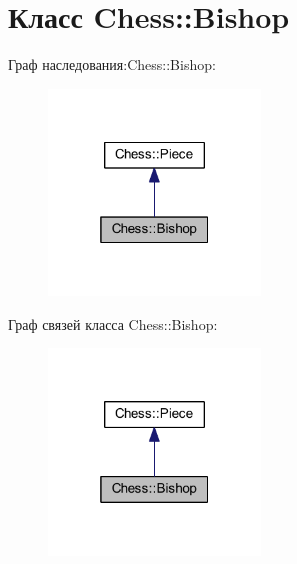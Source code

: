 \hypertarget{class_chess_1_1_bishop}{}\section{Класс Chess\+:\+:Bishop}
\label{class_chess_1_1_bishop}


Граф наследования\+:Chess\+:\+:Bishop\+:\nopagebreak
\begin{figure}[H]
\begin{center}
\leavevmode
\includegraphics[width=160pt]{class_chess_1_1_bishop__inherit__graph}
\end{center}
\end{figure}


Граф связей класса Chess\+:\+:Bishop\+:\nopagebreak
\begin{figure}[H]
\begin{center}
\leavevmode
\includegraphics[width=160pt]{class_chess_1_1_bishop__coll__graph}
\end{center}
\end{figure}
